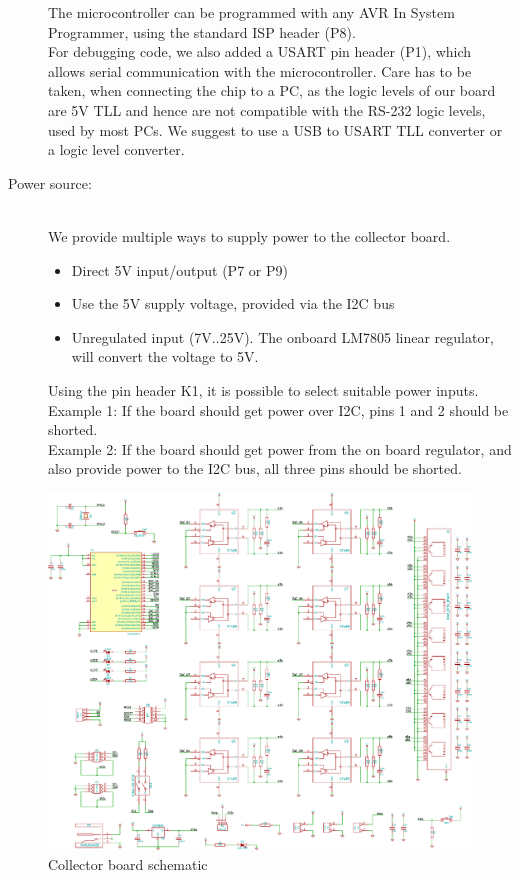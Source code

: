 \documentclass[a4paper]{scrreprt}
\begin{document}
\begin{description}
    The microcontroller can be programmed with any AVR In System
    Programmer, using the standard ISP header (P8).\\
    For debugging code, we also added a USART pin header (P1), which
    allows serial communication with the microcontroller. Care
    has to be taken, when connecting the chip to a PC, as the logic
    levels of our board are 5V TLL and hence are not compatible
    with the RS-232 logic levels, used by most PCs. We suggest to use
    a USB to USART TLL converter or a logic level converter.
  \item[Power source:]\hspace{1cm}\\
    We provide multiple ways to supply power to the collector board.
    \begin{itemize}
      \item Direct 5V input/output (P7 or P9)
      \item Use the 5V supply voltage, provided via the I2C bus
      \item Unregulated input (7V..25V). The onboard LM7805 linear
        regulator, will convert the voltage to 5V.
    \end{itemize}
    Using the pin header K1, it is possible to select suitable
    power inputs.\\
    Example 1: If the board should get power over I2C, pins 1 and 2
    should be shorted.\\
    Example 2: If the board should get power from the on board
    regulator, and also provide power to the I2C bus, all three pins
    should be shorted.
\end{description}
\begin{figure}
	\centering
	\includegraphics[width=1\textwidth]{img/schem_collector_board.pdf}
	\caption{Collector board schematic}
	\label{fig:schem_collect}
\end{figure}
\end{document}
